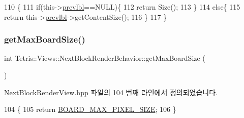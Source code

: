 \begin{DoxyCode}
110                                \{
111                 \textcolor{keywordflow}{if}(this->\hyperlink{class_tetris_1_1_views_1_1_next_block_render_behavior_afc0dbfd7dbdf66e88a804a109b470546}{prevlbl}==NULL)\{
112                     \textcolor{keywordflow}{return} Size();
113                 \}
114                 \textcolor{keywordflow}{else}\{
115                     \textcolor{keywordflow}{return} this->\hyperlink{class_tetris_1_1_views_1_1_next_block_render_behavior_afc0dbfd7dbdf66e88a804a109b470546}{prevlbl}->getContentSize();
116                 \}
117             \}
\end{DoxyCode}
\mbox{\label{class_tetris_1_1_views_1_1_next_block_render_behavior_aa1d5fbc45ec963fa86fff0f73359d028}} 
\subsubsection{\texorpdfstring{get\+Max\+Board\+Size()}{getMaxBoardSize()}}
{\footnotesize\ttfamily int Tetris\+::\+Views\+::\+Next\+Block\+Render\+Behavior\+::get\+Max\+Board\+Size (\begin{DoxyParamCaption}{ }\end{DoxyParamCaption})\hspace{0.3cm}{\ttfamily [inline]}}



Next\+Block\+Render\+View.\+hpp 파일의 104 번째 라인에서 정의되었습니다.


\begin{DoxyCode}
104                                  \{
105                 \textcolor{keywordflow}{return} \hyperlink{_next_block_render_view_8hpp_aec637c7cd1d487afbbfc64aefd2d5f2c}{BOARD\_MAX\_PIXEL\_SIZE};
106             \}
\end{DoxyCode}
\mbox{\label{class_tetris_1_1_views_1_1_next_block_render_behavior_a71f46d8714e29a672ae20b0af5f4db2e}} 
